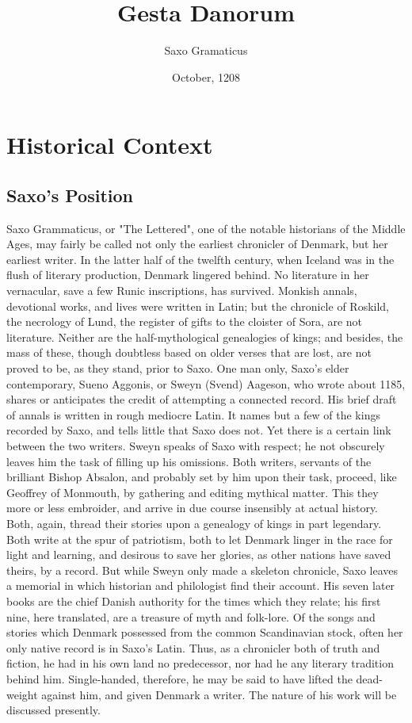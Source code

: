 \documentclass[10pt,a4paper]{report}
\begin{document}
\title{Gesta Danorum}
\author{Saxo Gramaticus}
\date{October, 1208}
\maketitle
\tableofcontents

\part{Historical Context}

\chapter{Saxo's Position}
Saxo Grammaticus, or "The Lettered", one of the notable historians of the Middle Ages, may fairly be called not only the earliest chronicler of Denmark, but her earliest writer. In the latter half of the twelfth century, when Iceland was in the flush of literary production, Denmark lingered behind. No literature in her vernacular, save a few Runic inscriptions, has survived. Monkish annals, devotional works, and lives were written in Latin; but the chronicle of Roskild, the necrology of Lund, the register of gifts to the cloister of Sora, are not literature. Neither are the half-mythological genealogies of kings; and besides, the mass of these, though doubtless based on older verses that are lost, are not proved to be, as they stand, prior to Saxo. One man only, Saxo's elder contemporary, Sueno Aggonis, or Sweyn (Svend) Aageson, who wrote about 1185, shares or anticipates the credit of attempting a connected record. His brief draft of annals is written in rough mediocre Latin. It names but a few of the kings recorded by Saxo, and tells little that Saxo does not. Yet there is a certain link between the two writers. Sweyn speaks of Saxo with respect; he not obscurely leaves him the task of filling up his omissions. Both writers, servants of the brilliant Bishop Absalon, and probably set by him upon their task, proceed, like Geoffrey of Monmouth, by gathering and editing mythical matter. This they more or less embroider, and arrive in due course insensibly at actual history. Both, again, thread their stories upon a genealogy of kings in part legendary. Both write at the spur of patriotism, both to let Denmark linger in the race for light and learning, and desirous to save her glories, as other nations have saved theirs, by a record. But while Sweyn only made a skeleton chronicle, Saxo leaves a memorial in which historian and philologist find their account. His seven later books are the chief Danish authority for the times which they relate; his first nine, here translated, are a treasure of myth and folk-lore. Of the songs and stories which Denmark possessed from the common Scandinavian stock, often her only native record is in Saxo's Latin. Thus, as a chronicler both of truth and fiction, he had in his own land no predecessor, nor had he any literary tradition behind him. Single-handed, therefore, he may be said to have lifted the dead-weight against him, and given Denmark a writer. The nature of his work will be discussed presently.
\end{document}
